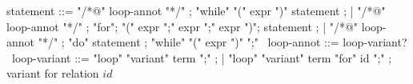 \begin{syntax}
  statement ::= "/*@" loop-annot "*/" ;
  "while" "(" expr ")" statement ;
  | "/*@" loop-annot "*/" ;
  "for";
  "(" expr ";" expr ";" expr ")";
  statement ;
  | "/*@" loop-annot "*/" ;
  "do" statement ;
  "while" "(" expr ")" ";"
  \
  loop-annot ::= loop-variant?
  \
  loop-variant ::= "loop" "variant" term ";" ;
  | "loop" "variant" term "for" id ";" ; variant for relation $id$
\end{syntax}

